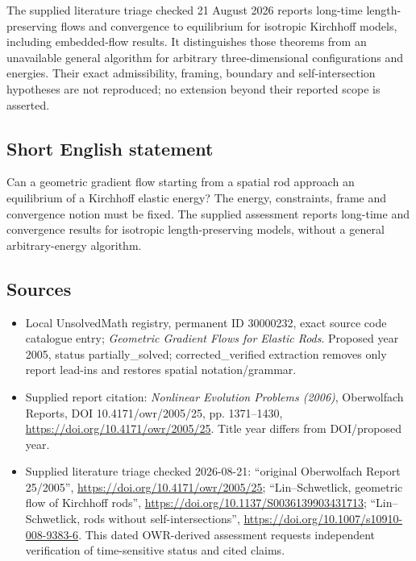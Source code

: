 \documentclass[11pt]{article}
\begin{document}
The supplied literature triage checked 21 August 2026 reports long-time length-preserving flows and convergence to equilibrium for isotropic Kirchhoff models, including embedded-flow results. It distinguishes those theorems from an unavailable general algorithm for arbitrary three-dimensional configurations and energies. Their exact admissibility, framing, boundary and self-intersection hypotheses are not reproduced; no extension beyond their reported scope is asserted.
\subsection{Short English statement}
Can a geometric gradient flow starting from a spatial rod approach an equilibrium of a Kirchhoff elastic energy? The energy, constraints, frame and convergence notion must be fixed. The supplied assessment reports long-time and convergence results for isotropic length-preserving models, without a general arbitrary-energy algorithm.
\subsection{Sources}
\begin{itemize}
\item Local UnsolvedMath registry, permanent ID 30000232, exact source code catalogue entry; \emph{Geometric Gradient Flows for Elastic Rods}. Proposed year 2005, status partially\_solved; corrected\_verified extraction removes only report lead-ins and restores spatial notation/grammar.
\item Supplied report citation: \emph{Nonlinear Evolution Problems (2006)}, Oberwolfach Reports, DOI 10.4171/owr/2005/25, pp. 1371--1430, \url{https://doi.org/10.4171/owr/2005/25}. Title year differs from DOI/proposed year.
\item Supplied literature triage checked 2026-08-21: ``original Oberwolfach Report 25/2005'', \url{https://doi.org/10.4171/owr/2005/25}; ``Lin--Schwetlick, geometric flow of Kirchhoff rods'', \url{https://doi.org/10.1137/S0036139903431713}; ``Lin--Schwetlick, rods without self-intersections'', \url{https://doi.org/10.1007/s10910-008-9383-6}. This dated OWR-derived assessment requests independent verification of time-sensitive status and cited claims.
\end{itemize}
\end{document}

